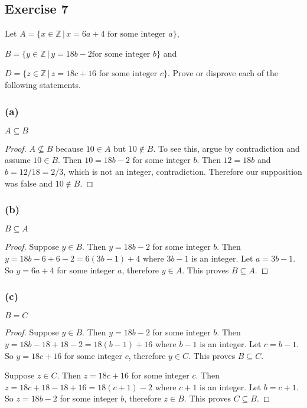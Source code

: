 \documentclass[14pt]{extarticle}
\newcommand{\Z}{\mathbb{Z}}
\begin{document}
\subsection{Exercise 7}
Let \(A = \{x \in \Z \, | \, x = 6a+4 \text{ for some integer } a\}\),

\(B = \{y \in \Z \, | \, y = 18b-2 \text{
  for some integer } b\}\) and

\(D = \{z \in \Z \, | \, z = 18c+16 \text{ for some integer } c\}\).
Prove or disprove each of the following statements.

\subsubsection{(a)}
\(A \subseteq B\)

\begin{proof}
  \(A \nsubseteq B\) because $10 \in A$ but $10 \notin B$. To see this, argue by contradiction and assume $10 \in B$.
  Then \(10 = 18b-2\) for some integer $b$. Then \(12 = 18b\) and \(b = 12/18 = 2/3\), which is not an integer,
  contradiction. Therefore our supposition was false and $10 \notin B$.
\end{proof}

\subsubsection{(b)}
\(B \subseteq A\)

\begin{proof}
  Suppose $y \in B$. Then \(y = 18b-2\) for some integer $b$. Then \(y = 18b-6+6-2 = 6(3b-1) + 4\) where $3b-1$ is an
  integer. Let $a = 3b-1$. So \(y = 6a + 4\) for some integer $a$, therefore $y \in A$. This proves \(B \subseteq A\).
\end{proof}

\subsubsection{(c)}
$B = C$

\begin{proof}
  Suppose $y \in B$. Then \(y = 18b-2\) for some integer $b$. Then \(y = 18b-18+18-2 = 18(b-1) + 16\) where $b-1$ is an
  integer. Let $c = b-1$. So \(y = 18c + 16\) for some integer $c$, therefore $y \in C$. This proves \(B \subseteq C\).

  Suppose $z \in C$. Then \(z = 18c+16\) for some integer $c$. Then \(z = 18c+18-18+16 = 18(c+1) -2\) where $c+1$ is an integer. Let $b = c+1$. So \(z = 18b -2\) for some integer $b$, therefore $z \in B$. This proves \(C \subseteq B\).
\end{proof}
\end{document}
